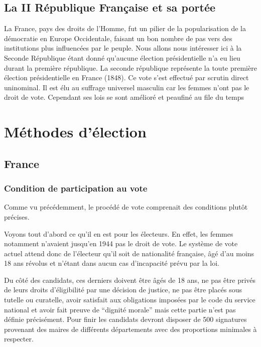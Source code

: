 \documentclass[12pt,a4paper]{report}
\begin{document}
\section{La II République Française et sa portée}
La France, pays des droits de l’Homme, fut un pilier de la popularisation de la démocratie en Europe Occidentale, faisant un bon nombre de pas vers des institutions plus influencées par le peuple.
Nous allons nous intéresser ici à la Seconde République étant donné qu’aucune élection présidentielle n'a eu lieu durant la première république\nocite{wiki:deuxiemerep}.
La seconde république représente la toute première élection présidentielle en France (1848)\nocite{wiki:1848}.
Ce vote s'est effectué par scrutin direct uninominal.
Il est élu au suffrage universel masculin car les femmes n’ont pas le droit de vote. Cependant ses lois se sont amélioré et peaufiné au file du temps \nocite{wiki:premiererep}


\chapter{Méthodes d'élection}
\section{France} %
\subsection{Condition de participation au vote}

Comme vu précédemment, le procédé de vote comprenait des conditions plutôt précises.

Voyons tout d'abord ce qu'il en est pour les électeurs.
En effet, les femmes notamment n’avaient jusqu'en 1944 \nocite{wiki:droitvotefemmes} pas le droit de vote.
Le système de vote actuel attend donc de l'électeur qu’il soit de nationalité française, âgé d'au moins 18 ans révolus et n’étant dans aucun cas d’incapacité prévu par la loi.

Du côté des candidats, ces derniers doivent être âgés de 18 ans, ne pas être privés de leurs droits d’éligibilité par une décision de justice, ne pas être placés sous tutelle ou curatelle, avoir satisfait aux obligations imposées par le code du service national et avoir fait preuve de “dignité morale” mais cette partie n’est pas définie précisément.
Pour finir les candidats devront disposer de 500 signatures provenant des maires de différents départements avec des proportions minimales à respecter.
\end{document}
